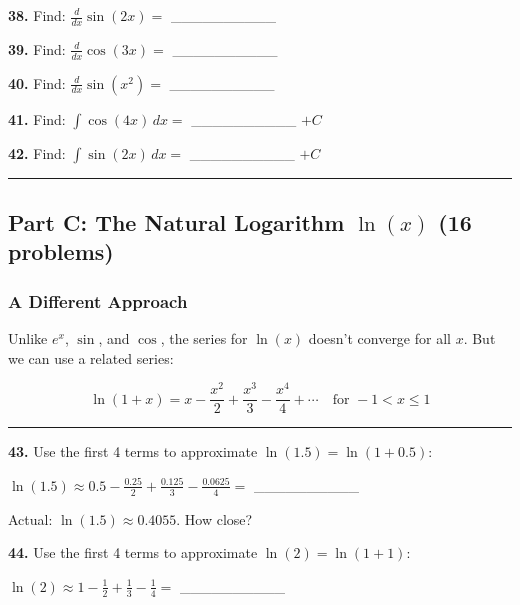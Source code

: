 \documentclass[
  11pt,
]{article}
\begin{document}
\textbf{38.} Find: \(\frac{d}{dx}\sin(2x) ={}\) \_\_\_\_\_\_\_\_\_\_

\textbf{39.} Find: \(\frac{d}{dx}\cos(3x) ={}\) \_\_\_\_\_\_\_\_\_\_

\textbf{40.} Find: \(\frac{d}{dx}\sin(x^2) ={}\) \_\_\_\_\_\_\_\_\_\_

\textbf{41.} Find: \(\int \cos(4x) \, dx ={}\) \_\_\_\_\_\_\_\_\_\_
\(+ C\)

\textbf{42.} Find: \(\int \sin(2x) \, dx ={}\) \_\_\_\_\_\_\_\_\_\_
\(+ C\)

\begin{center}\rule{0.5\linewidth}{0.5pt}\end{center}

\hypertarget{part-c-the-natural-logarithm-lnx-16-problems}{%
\subsection{\texorpdfstring{Part C: The Natural Logarithm \(\ln(x)\) (16
problems)}{Part C: The Natural Logarithm \textbackslash ln(x) (16 problems)}}\label{part-c-the-natural-logarithm-lnx-16-problems}}

\hypertarget{a-different-approach}{%
\subsubsection{A Different Approach}\label{a-different-approach}}

Unlike \(e^x\), \(\sin\), and \(\cos\), the series for \(\ln(x)\)
doesn't converge for all \(x\). But we can use a related series:

\[\ln(1 + x) = x - \frac{x^2}{2} + \frac{x^3}{3} - \frac{x^4}{4} + \cdots \quad \text{for } -1 < x \leq 1\]

\begin{center}\rule{0.5\linewidth}{0.5pt}\end{center}

\textbf{43.} Use the first 4 terms to approximate
\(\ln(1.5) = \ln(1 + 0.5)\):

\(\ln(1.5) \approx 0.5 - \frac{0.25}{2} + \frac{0.125}{3} - \frac{0.0625}{4} ={}\)
\_\_\_\_\_\_\_\_\_\_

Actual: \(\ln(1.5) \approx 0.4055\). How close?

\textbf{44.} Use the first 4 terms to approximate
\(\ln(2) = \ln(1 + 1)\):

\(\ln(2) \approx 1 - \frac{1}{2} + \frac{1}{3} - \frac{1}{4} ={}\)
\_\_\_\_\_\_\_\_\_\_
\end{document}
